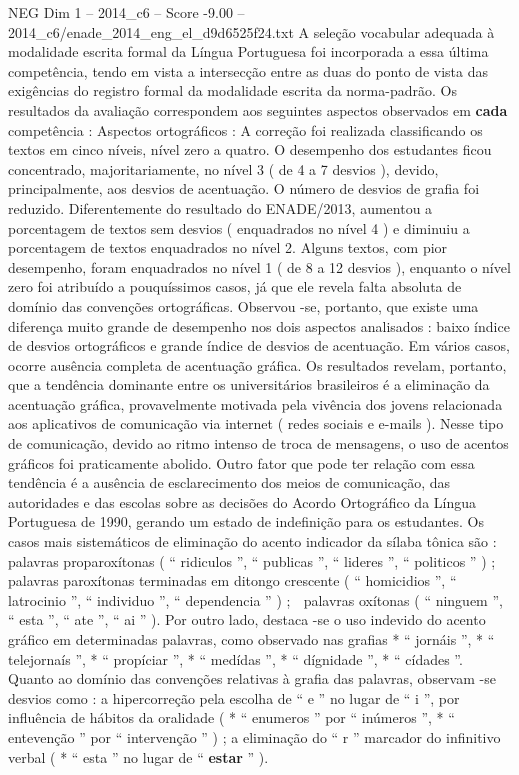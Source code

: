 \begin{textsample}{NEG Dim 1 – 2014\_c6 – Score -9.00 – 2014\_c6/enade\_2014\_eng\_el\_d9d6525f24.txt}
A seleção vocabular adequada à modalidade escrita formal da Língua Portuguesa foi incorporada a essa última competência, tendo em vista a intersecção entre as duas do ponto de vista das exigências do registro formal da modalidade escrita da norma-padrão.
Os resultados da avaliação correspondem aos seguintes aspectos observados em \textbf{cada} competência : Aspectos ortográficos : A correção foi realizada classificando os textos em cinco níveis, nível zero a quatro.
O desempenho dos estudantes ficou concentrado, majoritariamente, no nível 3 ( de 4 a 7 desvios ), devido, principalmente, aos desvios de acentuação.
O número de desvios de grafia foi reduzido.
Diferentemente do resultado do ENADE/2013, aumentou a porcentagem de textos sem desvios ( enquadrados no nível 4 ) e diminuiu a porcentagem de textos enquadrados no nível 2.
Alguns textos, com pior desempenho, foram enquadrados no nível 1 ( de 8 a 12 desvios ), enquanto o nível zero foi atribuído a pouquíssimos casos, já que ele revela falta absoluta de domínio das convenções ortográficas.
Observou -se, portanto, que existe uma diferença muito grande de desempenho nos dois aspectos analisados : baixo índice de desvios ortográficos e grande índice de desvios de acentuação.
Em vários casos, ocorre ausência completa de acentuação gráfica.
Os resultados revelam, portanto, que a tendência dominante entre os universitários brasileiros é a eliminação da acentuação gráfica, provavelmente motivada pela vivência dos jovens relacionada aos aplicativos de comunicação via internet ( redes sociais e e-mails ).
Nesse tipo de comunicação, devido ao ritmo intenso de troca de mensagens, o uso de acentos gráficos foi praticamente abolido.
Outro fator que pode ter relação com essa tendência é a ausência de esclarecimento dos meios de comunicação, das autoridades e das escolas sobre as decisões do Acordo Ortográfico da Língua Portuguesa de 1990, gerando um estado de indefinição para os estudantes.
Os casos mais sistemáticos de eliminação do acento indicador da sílaba tônica são :  palavras proparoxítonas ( “ ridiculos ”, “ publicas ”, “ lideres ”, “ politicos ” ) ;  palavras paroxítonas terminadas em ditongo crescente ( “ homicidios ”, “ latrocinio ”, “ individuo ”, “ dependencia ” ) ;  palavras oxítonas ( “ ninguem ”, “ esta ”, “ ate ”, “ ai ” ).
Por outro lado, destaca -se o uso indevido do acento gráfico em determinadas palavras, como observado nas grafias * “ jornáis ”, * “ telejornaís ”, * “ propíciar ”, * “ medídas ”, * “ dígnidade ”, * “ cídades ”.
Quanto ao domínio das convenções relativas à grafia das palavras, observam -se desvios como : a hipercorreção pela escolha de “ e ” no lugar de “ i ”, por influência de hábitos da oralidade ( * “ enumeros ” por “ inúmeros ”, * “ entevenção ” por “ intervenção ” ) ; a eliminação do “ r ” marcador do infinitivo verbal ( * “ esta ” no lugar de “ \textbf{estar} ” ).

\end{textsample}
